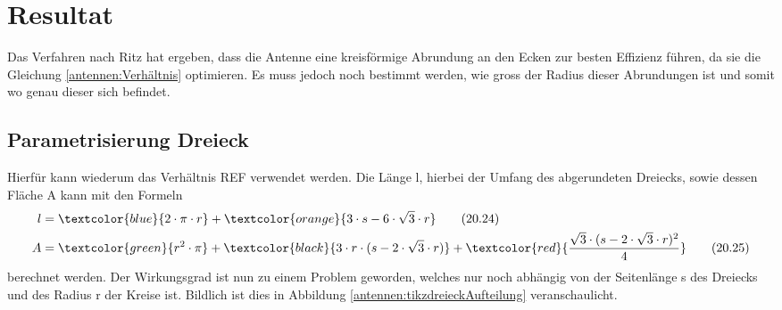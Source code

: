 %
%
% 
%
%

\section{Resultat\label{antennen:resultat}}

Das Verfahren nach Ritz hat ergeben, dass die Antenne eine kreisförmige Abrundung an den Ecken 
zur besten Effizienz führen, da sie die Gleichung \eqref{antennen:Verhältnis} optimieren. 
Es muss jedoch noch bestimmt werden, wie gross der Radius dieser Abrundungen ist und somit wo
genau dieser sich befindet. 

\subsection{Parametrisierung Dreieck\label{antennen:param3eck}}
Hierfür kann wiederum das Verhältnis REF verwendet werden. Die Länge l, hierbei der Umfang 
des abgerundeten Dreiecks, sowie dessen Fläche A kann mit den Formeln
\begin{align}
	l &= \textcolor{blue}{2 \cdot \pi \cdot r} + \textcolor{orange}{3 \cdot s - 6 \cdot \sqrt{3} \cdot r} \tag{20.24} \label{antennen:Länge} \\
	A &= \textcolor{green}{r^2 \cdot \pi} + \textcolor{black}{3 \cdot r \cdot (s - 2 \cdot \sqrt{3} \cdot r)} + \textcolor{red}{\frac{\sqrt{3} \cdot (s - 2 \cdot \sqrt{3} \cdot r)^2}{4}} \tag{20.25} \label{antennen:Fläche}
\end{align}
\setcounter{equation}{25}
berechnet werden.
Der Wirkungsgrad ist nun zu einem Problem geworden, welches nur noch abhängig von 
der Seitenlänge s des Dreiecks und des Radius r der Kreise ist. Bildlich ist dies 
in Abbildung \ref{antennen:tikzdreieckAufteilung} veranschaulicht.

